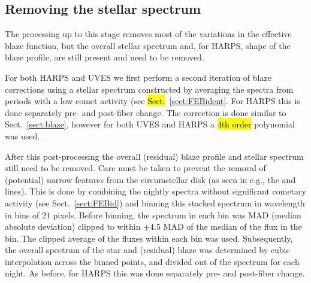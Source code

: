 \documentclass{aa}
\begin{document}
\subsection{Removing the stellar spectrum}\label{sect:starcor}
The processing up to this stage removes most of the variations in the effective blaze function, but the overall stellar spectrum and, for HARPS, shape of the blaze profile, are still present and need to be removed. 

For both HARPS and UVES we first perform a second iteration of blaze corrections using a  stellar spectrum constructed by averaging the spectra from periods with a low comet activity (see \hl{Sect.}~\ref{sect:FEBident}. For HARPS this is done separately pre- and post-fiber change. The correction is done similar to Sect.~\ref{sect:blaze}, however for both UVES and HARPS a \hl{4th order} polynomial was used.

After this post-processing the overall (residual) blaze profile and stellar spectrum still need to be removed. Care must be taken to prevent the removal of (potential) narrow features from the circumstellar disk (as seen in e.g., the  and  lines). This is done by combining the nightly spectra without significant cometary activity (see Sect.~\ref{sect:FEBid}) and binning this stacked spectrum in wavelength in bins of 21 pixels. Before binning, the spectrum in each bin was MAD (median absolute deviation) clipped to within $\pm$4.5 MAD of the median of the flux in the bin. The clipped average of the fluxes within each bin was used. Subsequently, the overall spectrum of the star and (residual) blaze was determined by cubic interpolation across the binned points, and divided out of the spectrum for each night. As before, for HARPS this was done separately pre- and post-fiber change.




%
%

%
\end{document}
